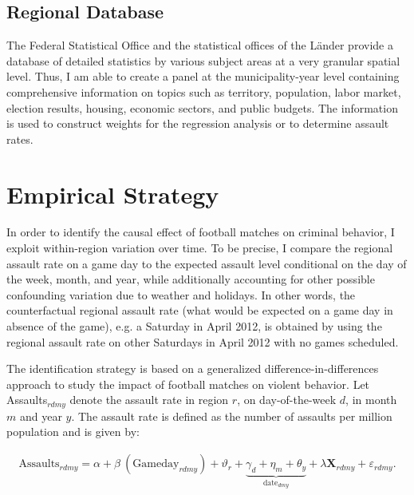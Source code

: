\subsection{Regional Database}
The Federal Statistical Office and the statistical offices of the Länder provide a database of detailed statistics by various subject areas at a very granular spatial level. Thus, I am able to create a panel at the municipality-year level containing comprehensive information on topics such as territory, population, labor market, election results, housing, economic sectors, and public budgets. The information is used to construct weights for the regression analysis or to determine assault rates. 







\bigskip
\section{Empirical Strategy}\label{sec_soc_ext:empirical_strategy}

In order to identify the causal effect of football matches on criminal behavior, I exploit within-region variation over time. To be precise, I compare the regional assault rate on a game day to the expected assault level conditional on the day of the week, month, and year, while additionally accounting for other possible confounding variation due to weather and holidays. In other words, the counterfactual regional assault rate (what would be expected on a game day in absence of the game), e.g. a Saturday in April 2012, is obtained by using the regional assault rate on other Saturdays in April 2012 with no games scheduled. %


The identification strategy is based on a generalized difference-in-differences approach to study the impact of football matches on violent behavior. Let Assaults$_{rdmy}$ denote the assault rate in region $r$, on day-of-the-week $d$, in month $m$ and year $y$. The assault rate is defined as the number of assaults per million population and is given by:

\begin{align}
\text{Assaults}_{rdmy} = \alpha + \beta\ (\text{Gameday}_{rdmy}) + \vartheta_r + \underbrace{\gamma_d + \eta_m + \theta_y}_{\text{date}_{dmy}} + \lambda \mathbf{X}_{rdmy} + \varepsilon_{rdmy}
\label{eq_soc_ext:model}.
\end{align}

